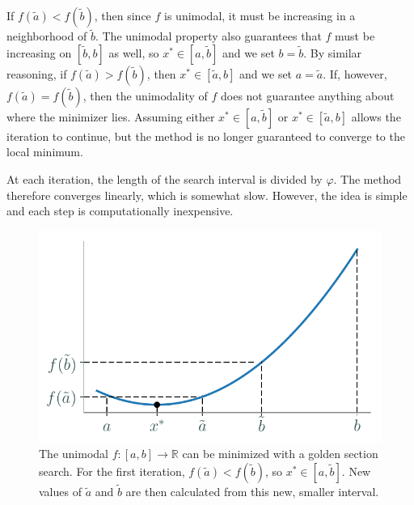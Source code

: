 If $f(\tilde{a}) < f(\tilde{b})$, then since $f$ is unimodal, it must be increasing in a neighborhood of $\tilde{b}$.
The unimodal property also guarantees that $f$ must be increasing on $[\tilde{b}, b]$ as well, so $x^* \in [a, \tilde{b}]$ and we set $b = \tilde{b}$.
By similar reasoning, if $f(\tilde{a}) > f(\tilde{b})$, then $x^* \in [\tilde{a}, b]$ and we set $a = \tilde{a}$.
If, however, $f(\tilde{a}) = f(\tilde{b})$, then the unimodality of $f$ does not guarantee anything about where the minimizer lies.
Assuming either $x^*\in [a, \tilde{b}]$ or $x^* \in [\tilde{a}, b]$ allows the iteration to continue, but the method is no longer guaranteed to converge to the local minimum.

At each iteration, the length of the search interval is divided by $\varphi$.
The method therefore converges linearly, which is somewhat slow.
However, the idea is simple and each step is computationally inexpensive.

\begin{figure}[H] %
    \centering
    \includegraphics[width=.7\textwidth]{figures/golden_section.pdf}
    \caption{The unimodal $f:[a,b]\rightarrow\mathbb{R}$ can be minimized with a golden section search.
    For the first iteration, $f(\tilde{a}) < f(\tilde{b})$, so $x^* \in [a, \tilde{b}]$.
    New values of $\tilde{a}$ and $\tilde{b}$ are then calculated from this new, smaller interval.}
    \label{fig:1dopt-golden-unimodal}
\end{figure}

